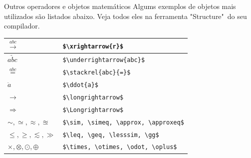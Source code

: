 \documentclass[c]{beamer}
\begin{document}
{\begin{frame}[fragile]{\sc Outros operadores e objetos matemáticos}
Algums exemplos de objetos mais utilizados são listados abaixo. Veja todos eles na ferramenta "Structure"\ do seu compilador.
\begin{table}[h]
    \begin{tabular}{|l|l|} 
        \hline
        $\xrightarrow{abc}$ & \verb|$\xrightarrow{r}$|  \\ \hline
        $\underrightarrow{abc}$ & \verb|$\underrightarrow{abc}$| \\ \hline
        $\stackrel{abc}{=}$ & \verb|$\stackrel{abc}{=}$| \\ \hline
        $\ddot{a}$ & \verb|$\ddot{a}$| \\ \hline
        $\longrightarrow$ & \verb|$\longrightarrow$| \\ \hline
        $\Longrightarrow$ & \verb|$\Longrightarrow$| \\ \hline
		$\sim, \simeq, \approx, \approxeq$ & \verb|$\sim, \simeq, \approx, \approxeq$| \\ \hline
        $\leq, \geq, \lesssim, \gg$ & \verb|$\leq, \geq, \lesssim, \gg$| \\ \hline
        $\times, \otimes, \odot, \oplus$ & \verb|$\times, \otimes, \odot, \oplus$| \\ \hline
    \end{tabular}
\end{table}
\end{frame}


}
\end{document}
